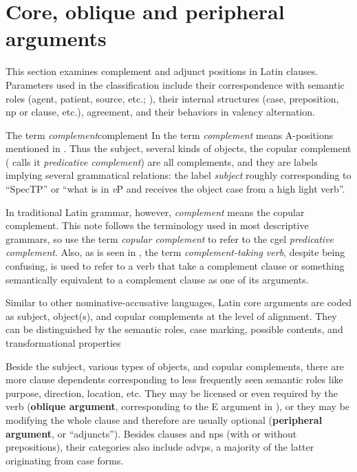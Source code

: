 \documentclass[a4paper, oneside]{report}
\newcommand*{\citesec}[1]{\S~{#1}}
\newcommand*{\citepage}[1]{p.~{#1}}
\newcommand*{\concept}[1]{\textbf{#1}}
\newcommand*{\term}[1]{\emph{#1}}
\newcommand{\vP}{\textit{v}P}
\begin{document}
\section{Core, oblique and peripheral arguments}\label{sec:core-argument-marking}

This section examines complement and adjunct positions in Latin clauses. 
Parameters used in the classification include 
their correspondence with semantic roles 
(agent, patient, source, etc.; 
\citealt[\citesec{4.2}]{cgel}),
their internal structures (case, preposition, \acs{np} or clause, etc.), 
agreement, and
their behaviors in valency alternation.

\begin{infobox}{The term \term{complement}}{complement}
    In \citet{cgel} the term \term{complement} 
    means A-positions mentioned in .
    Thus the subject, several kinds of objects,
    the copular complement (\cite{cgel} calls it \term{predicative complement}) are all complements,
    and they are labels implying several grammatical relations:
    the label \term{subject} roughly corresponding to ``SpecTP'' or ``what is in \vP{} 
    and receives the object case from a high light verb''.

    In traditional Latin grammar, however, \term{complement} means the copular complement. 
    This note follows the terminology used in most descriptive grammars,
    so use the term \term{copular complement} to refer to the \ac{cgel} \term{predicative complement}.
    Also, as is seen in , 
    the term \term{complement-taking verb}, despite being confusing,
    is used to refer to a verb that take a complement clause 
    or something semantically equivalent to a complement clause
    as one of its arguments.
\end{infobox}

Similar to other nominative-accusative languages,
Latin core arguments are coded as subject, object(s),
and copular complements at the level of alignment.
They can be distinguished by the semantic roles,
case marking, possible contents, and transformational properties

Beside the subject, various types of objects, and copular complements,
there are more clause dependents
corresponding to less frequently seen semantic roles 
like purpose, direction, location, etc.
They may be licensed or even required by the verb 
(\concept{oblique argument}, 
corresponding to the E argument in \citet[\citepage{116}]{dixon2009basic2}),
or they may be modifying the whole clause and therefore are usually optional 
(\concept{peripheral argument}, or ``adjuncts'').
Besides clauses and \ac{np}s (with or without prepositions),
their categories also include \ac{advp}s,
a majority of the latter originating from case forms.
\end{document}
